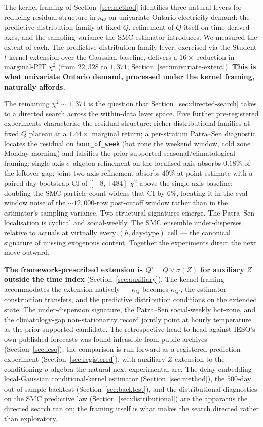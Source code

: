 The kernel framing of Section~\ref{sec:method} identifies three
natural levers for reducing residual structure in $\kappa_Q$ on
univariate Ontario electricity demand: the predictive-distribution
family at fixed $Q$, refinement of $Q$ itself on time-derived
axes, and the sampling variance the SMC estimator introduces. We
measured the extent of each. The predictive-distribution-family
lever, exercised via the Student-$t$ kernel extension over the
Gaussian baseline, delivers a $16\times$ reduction in marginal-PIT
$\chi^2$ (from $22{,}328$ to $1{,}371$;
Section~\ref{sec:univariate-extent}). \textbf{This is what
univariate Ontario demand, processed under the kernel framing,
naturally affords.}

The remaining $\chi^2 \sim 1{,}371$ is the question that
Section~\ref{sec:directed-search} takes to a directed search
across the within-data lever space. Five further pre-registered
experiments characterise the residual structure: richer
distributional families at fixed $Q$ plateau at a $1.44\times$
marginal return; a per-stratum Patra--Sen diagnostic locates the
residual on \texttt{hour\_of\_week} (hot zone the weekend window,
cold zone Monday morning) and falsifies the prior-supported
seasonal/climatological framing; single-axis $\sigma$-algebra
refinement on the localised axis absorbs $0.18\%$ of the leftover
gap; joint two-axis refinement absorbs $40\%$ at point estimate
with a paired-day bootstrap CI of $[+8, +484]$ $\chi^2$ above the
single-axis baseline; doubling the SMC particle count widens that
CI by $6\%$, locating it in the eval-window noise of the
$\sim 12{,}000$-row post-cutoff window rather than in the
estimator's sampling variance. Two structural signatures emerge.
The Patra--Sen localisation is cyclical and social-weekly. The
SMC ensemble under-disperses relative to actuals at virtually
every $(h, \text{day-type})$ cell --- the canonical signature of
missing exogenous content. Together the experiments direct the
next move outward.

\textbf{The framework-prescribed extension is
$Q' = Q \vee \sigma(Z)$ for auxiliary $Z$ outside the time index}
(Section~\ref{sec:auxiliary}). The kernel framing accommodates
the extension natively --- $\kappa_Q$ becomes $\kappa_{Q'}$, the
estimator construction transfers, and the predictive distribution
conditions on the extended state. The under-dispersion signature,
the Patra--Sen social-weekly hot-zone, and the climatology-gap
non-stationarity record jointly point at hourly temperature as
the prior-supported candidate. The retrospective head-to-head
against IESO's own published forecasts was found infeasible from
public archives (Section~\ref{sec:ieso}); the comparison is run
forward as a registered prediction experiment
(Section~\ref{sec:registered}), with auxiliary-$Z$ extension to
the conditioning $\sigma$-algebra the natural next experimental
arc. The delay-embedding local-Gaussian conditional-kernel
estimator (Section~\ref{sec:method}), the $500$-day out-of-sample
backtest (Section~\ref{sec:backtest}), and the distributional
diagnostics on the SMC predictive law
(Section~\ref{sec:distributional}) are the apparatus the directed
search ran on; the framing itself is what makes the search
directed rather than exploratory.


